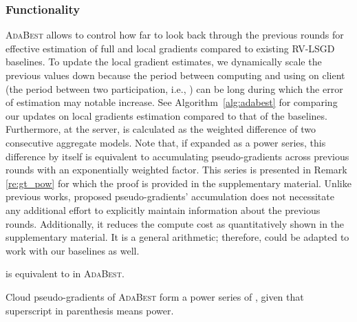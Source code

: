 \documentclass[runningheads]{llncs}
\def\algref#1{Algorithm~\ref{#1}}
\newcommand{\ours}{\textsc{AdaBest}\xspace}
\newcommand{\rvlsgd}{\textsc{RV-LSGD}\xspace}
\begin{document}
\subsubsection{Functionality}
\ours allows to control how far to look back through the previous rounds for effective estimation of full and local gradients compared to existing \rvlsgd baselines.
To update the local gradient estimates, we dynamically scale the previous values down because the period between computing and using  on client  (the period between two participation, i.e., ) can be long during which the error of estimation may notable increase.
See \algref{alg:adabest} for comparing our updates on local gradients estimation compared to that of the baselines.
Furthermore, at the server,  is calculated as the weighted difference of two consecutive aggregate models.
Note that, if expanded as a power series, this difference by itself is equivalent to accumulating pseudo-gradients across previous rounds with an exponentially weighted factor.
This series is presented in Remark \ref{re:gt_pow} for which the proof is provided in the supplementary material.
Unlike previous works, proposed pseudo-gradients' accumulation does not necessitate any additional effort to explicitly maintain information about the previous rounds.
Additionally, it reduces the compute cost as quantitatively shown in the supplementary material.
It is a general arithmetic; therefore, could be adapted to work with our baselines as well.


\begin{remark}
\label{re:gt_rec}
 is equivalent to  in \ours.
\end{remark}

\begin{remark}
\label{re:gt_pow}
Cloud pseudo-gradients of \ours form a power series of , given that superscript in parenthesis means power.
\end{remark}
\end{document}
